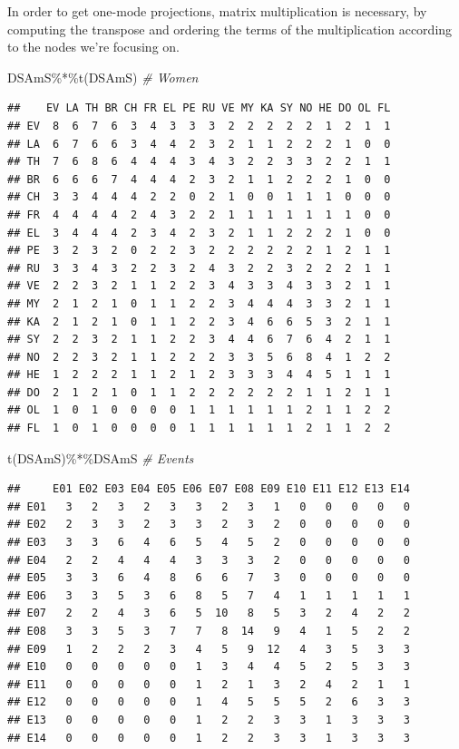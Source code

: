 \documentclass[
  notitlepage,
  onecolumn,
  openany]{book}
\newenvironment{Shaded}{\begin{snugshade}}{\end{snugshade}}
\newcommand{\CommentTok}[1]{\textcolor[rgb]{0.56,0.35,0.01}{\textit{#1}}}
\newcommand{\FunctionTok}[1]{\textcolor[rgb]{0.00,0.00,0.00}{#1}}
\newcommand{\NormalTok}[1]{#1}
\newcommand{\SpecialCharTok}[1]{\textcolor[rgb]{0.00,0.00,0.00}{#1}}
\begin{document}
In order to get one-mode projections, matrix multiplication is necessary, by computing the transpose and ordering the terms of the multiplication according to the nodes we're focusing on.

\begin{Shaded}
\begin{Highlighting}[]
\NormalTok{DSAmS}\SpecialCharTok{\%*\%}\FunctionTok{t}\NormalTok{(DSAmS) }\CommentTok{\# Women}
\end{Highlighting}
\end{Shaded}

\begin{verbatim}
##    EV LA TH BR CH FR EL PE RU VE MY KA SY NO HE DO OL FL
## EV  8  6  7  6  3  4  3  3  3  2  2  2  2  2  1  2  1  1
## LA  6  7  6  6  3  4  4  2  3  2  1  1  2  2  2  1  0  0
## TH  7  6  8  6  4  4  4  3  4  3  2  2  3  3  2  2  1  1
## BR  6  6  6  7  4  4  4  2  3  2  1  1  2  2  2  1  0  0
## CH  3  3  4  4  4  2  2  0  2  1  0  0  1  1  1  0  0  0
## FR  4  4  4  4  2  4  3  2  2  1  1  1  1  1  1  1  0  0
## EL  3  4  4  4  2  3  4  2  3  2  1  1  2  2  2  1  0  0
## PE  3  2  3  2  0  2  2  3  2  2  2  2  2  2  1  2  1  1
## RU  3  3  4  3  2  2  3  2  4  3  2  2  3  2  2  2  1  1
## VE  2  2  3  2  1  1  2  2  3  4  3  3  4  3  3  2  1  1
## MY  2  1  2  1  0  1  1  2  2  3  4  4  4  3  3  2  1  1
## KA  2  1  2  1  0  1  1  2  2  3  4  6  6  5  3  2  1  1
## SY  2  2  3  2  1  1  2  2  3  4  4  6  7  6  4  2  1  1
## NO  2  2  3  2  1  1  2  2  2  3  3  5  6  8  4  1  2  2
## HE  1  2  2  2  1  1  2  1  2  3  3  3  4  4  5  1  1  1
## DO  2  1  2  1  0  1  1  2  2  2  2  2  2  1  1  2  1  1
## OL  1  0  1  0  0  0  0  1  1  1  1  1  1  2  1  1  2  2
## FL  1  0  1  0  0  0  0  1  1  1  1  1  1  2  1  1  2  2
\end{verbatim}

\begin{Shaded}
\begin{Highlighting}[]
\FunctionTok{t}\NormalTok{(DSAmS)}\SpecialCharTok{\%*\%}\NormalTok{DSAmS }\CommentTok{\# Events}
\end{Highlighting}
\end{Shaded}

\begin{verbatim}
##     E01 E02 E03 E04 E05 E06 E07 E08 E09 E10 E11 E12 E13 E14
## E01   3   2   3   2   3   3   2   3   1   0   0   0   0   0
## E02   2   3   3   2   3   3   2   3   2   0   0   0   0   0
## E03   3   3   6   4   6   5   4   5   2   0   0   0   0   0
## E04   2   2   4   4   4   3   3   3   2   0   0   0   0   0
## E05   3   3   6   4   8   6   6   7   3   0   0   0   0   0
## E06   3   3   5   3   6   8   5   7   4   1   1   1   1   1
## E07   2   2   4   3   6   5  10   8   5   3   2   4   2   2
## E08   3   3   5   3   7   7   8  14   9   4   1   5   2   2
## E09   1   2   2   2   3   4   5   9  12   4   3   5   3   3
## E10   0   0   0   0   0   1   3   4   4   5   2   5   3   3
## E11   0   0   0   0   0   1   2   1   3   2   4   2   1   1
## E12   0   0   0   0   0   1   4   5   5   5   2   6   3   3
## E13   0   0   0   0   0   1   2   2   3   3   1   3   3   3
## E14   0   0   0   0   0   1   2   2   3   3   1   3   3   3
\end{verbatim}
\end{document}
